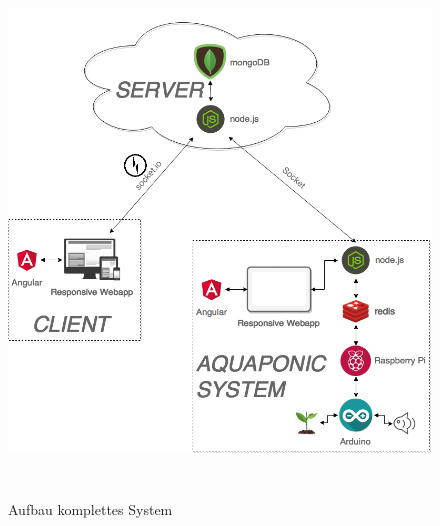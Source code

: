 \begin{figure}[ht]
    \centering
    \includegraphics[height=5.5in]{images/complete_system}
    \caption{Aufbau komplettes System}
\end{figure}



\afterpage{\blankpage}
